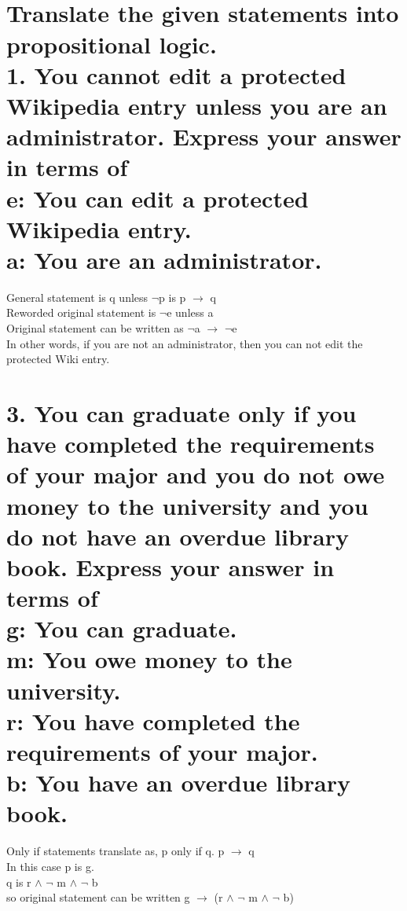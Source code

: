 \documentclass[11pt, oneside]{article} %
\numberwithin{equation}{section} %
\numberwithin{figure}{section} %
\begin{document}
\section{ \\
Translate the given statements into propositional logic.\\
1. You cannot edit a protected Wikipedia entry unless you are an administrator. Express your answer in terms of \\
e: You can edit a protected Wikipedia entry.\\
a: You are an administrator.} 
General statement is q unless $\neg$p is p $\rightarrow$ q \\
Reworded original statement is $\neg$e unless a \\
Original statement can be written as $\neg$a  $\rightarrow$ $\neg$e \\
In other words, if you are not an administrator, then you can not edit the protected Wiki entry.


\section{3. You can graduate only if you have completed the requirements of your major and you do not owe money to the university and you do not have an overdue library book. Express your answer in terms of \\
g: You can graduate. \\
m: You owe money to the university. \\
r: You have completed the requirements of your major. \\
b: You have an overdue library book.} 
Only if statements translate as, p only if q. p $\rightarrow$ q \\
In this case p is g.\\
q is r  $\wedge$ $\neg$ m  $\wedge$ $\neg$ b \\
so original statement can be written g $\rightarrow$ (r  $\wedge$ $\neg$ m  $\wedge$ $\neg$ b)
\end{document}
